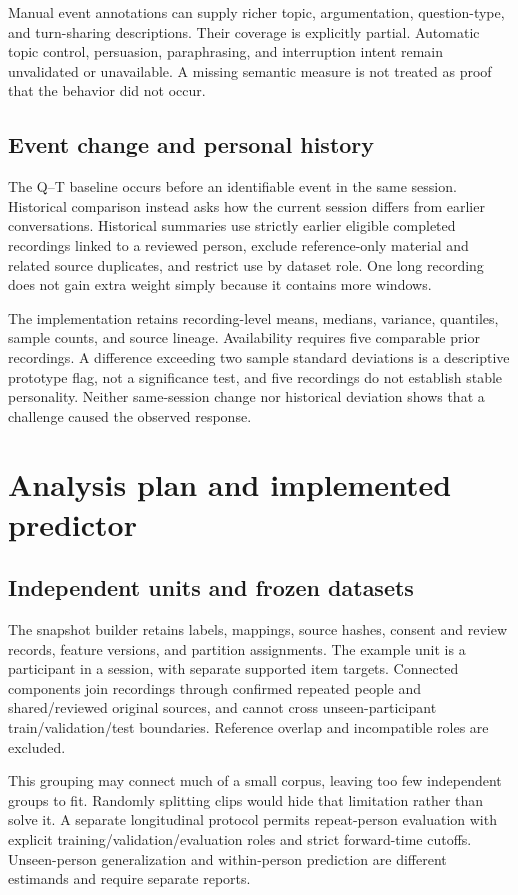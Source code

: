 \documentclass{article}
\begin{document}
Manual event annotations can supply richer topic, argumentation, question-type, and turn-sharing descriptions. Their coverage is explicitly partial. Automatic topic control, persuasion, paraphrasing, and interruption intent remain unvalidated or unavailable. A missing semantic measure is not treated as proof that the behavior did not occur.

\subsection{Event change and personal history}
The Q--T baseline occurs before an identifiable event in the same session. Historical comparison instead asks how the current session differs from earlier conversations. Historical summaries use strictly earlier eligible completed recordings linked to a reviewed person, exclude reference-only material and related source duplicates, and restrict use by dataset role. One long recording does not gain extra weight simply because it contains more windows.

The implementation retains recording-level means, medians, variance, quantiles, sample counts, and source lineage. Availability requires five comparable prior recordings. A difference exceeding two sample standard deviations is a descriptive prototype flag, not a significance test, and five recordings do not establish stable personality. Neither same-session change nor historical deviation shows that a challenge caused the observed response.

\section{Analysis plan and implemented predictor}
\subsection{Independent units and frozen datasets}
The snapshot builder retains labels, mappings, source hashes, consent and review records, feature versions, and partition assignments. The example unit is a participant in a session, with separate supported item targets. Connected components join recordings through confirmed repeated people and shared/reviewed original sources, and cannot cross unseen-participant train/validation/test boundaries. Reference overlap and incompatible roles are excluded.

This grouping may connect much of a small corpus, leaving too few independent groups to fit. Randomly splitting clips would hide that limitation rather than solve it. A separate longitudinal protocol permits repeat-person evaluation with explicit training/validation/evaluation roles and strict forward-time cutoffs. Unseen-person generalization and within-person prediction are different estimands and require separate reports.
\end{document}
